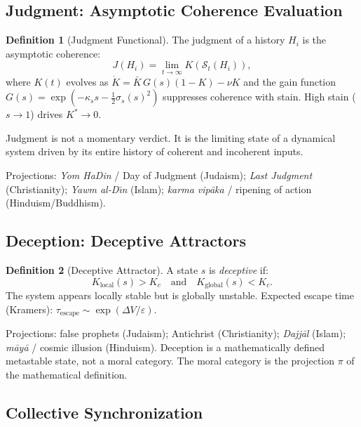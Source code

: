 \documentclass[12pt,oneside]{book}
\theoremstyle{definition}
\newtheorem{definition}{Definition}[chapter]
\begin{document}
\subsection{Judgment: Asymptotic Coherence Evaluation}

\begin{definition}[Judgment Functional]
  The judgment of a history $H_i$ is the asymptotic coherence:
  \begin{equation}
    J(H_i) = \lim_{t\to\infty} K(\mathcal{S}_t(H_i)),
  \end{equation}
  where $K(t)$ evolves as $\dot{K} = \bar{K}\,G(s)(1-K) - \nu K$ and the
  gain function $G(s) = \exp(-\kappa_s s - \tfrac{1}{2}\sigma_s(s)^2)$
  suppresses coherence with stain. High stain ($s\to1$) drives $K^*\to0$.
\end{definition}

Judgment is not a momentary verdict. It is the limiting state of a dynamical
system driven by its entire history of coherent and incoherent inputs.

\noindent Projections: \textit{Yom HaDin} / Day of Judgment (Judaism);
\textit{Last Judgment} (Christianity); \textit{Yawm al-D\={\i}n} (Islam);
\textit{karma vip\={a}ka} / ripening of action (Hinduism/Buddhism).

\subsection{Deception: Deceptive Attractors}

\begin{definition}[Deceptive Attractor]
  A state $s$ is \emph{deceptive} if:
  \begin{equation}
    K_{\mathrm{local}}(s) > K_c \quad \text{and} \quad K_{\mathrm{global}}(s) < K_c.
  \end{equation}
  The system appears locally stable but is globally unstable. Expected escape time
  (Kramers): $\tau_{\mathrm{escape}} \sim \exp(\Delta V/\varepsilon)$.
\end{definition}

\noindent Projections: false prophets (Judaism); Antichrist (Christianity);
\textit{Dajj\={a}l} (Islam); \textit{m\={a}y\={a}} / cosmic illusion (Hinduism).
Deception is a mathematically defined metastable state, not a moral category.
The moral category is the projection $\pi$ of the mathematical definition.

\subsection{Collective Synchronization}
\end{document}
